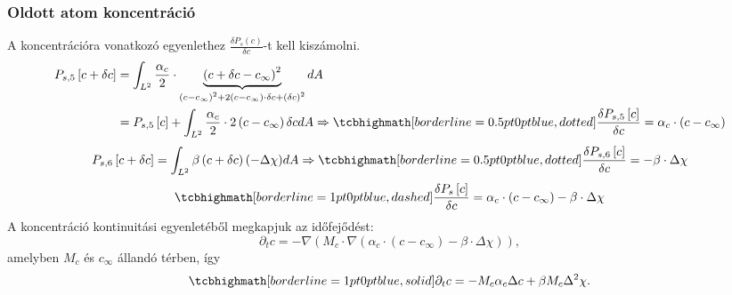 \documentclass[10pt,a4paper]{scrartcl}
\begin{document}
\subsubsection{Oldott atom koncentráció} A koncentrációra vonatkozó egyenlethez $\frac{{\delta {P_s}\left( c \right)}}{{\delta c}}$-t kell kiszámolni.
\begin{align}
  {P_{s,5}}\left[ {c + \delta c} \right] &  = \int_{{L^2}} {\frac{\alpha_c}{2}  \cdot \underbrace {{{\left( {c + \delta c - {c_\infty }} \right)}^2}}_{{{\left( {c - {c_\infty }} \right)}^2} + 2\left( {c - {c_\infty }} \right) \cdot \delta c + {{\left( {\delta c} \right)}^2}}dA} \nonumber \\ 
   &  = {P_{s,5}}\left[ c \right] + \int_{{L^2}} {\frac{\alpha_c}{2}  \cdot 2\left( {c - {c_\infty }} \right)\delta cdA}  \Rightarrow\tcbhighmath[borderline={0.5pt}{0pt}{blue,dotted}]{ \frac{{\delta {P_{s,5}}\left[ c \right]}}{{\delta c}} = \alpha_c  \cdot \left( {c - {c_\infty }} \right)}
\end{align}
\begin{equation}
{P_{s,6}}\left[ {c + \delta c} \right] = \int_{{L^2}} {\beta \left( {c + \delta c} \right)\left( { - \Delta \chi } \right)} dA \Rightarrow \tcbhighmath[borderline={0.5pt}{0pt}{blue,dotted}]{\frac{{\delta {P_{s,6}}\left[ c \right]}}{{\delta c}} =  - \beta  \cdot \Delta \chi}
\end{equation}
\begin{equation}
\tcbhighmath[borderline={1pt}{0pt}{blue,dashed}]{\frac{{\delta {P_s}\left[ c \right]}}{{\delta c}} = \alpha_c  \cdot \left( {c - {c_\infty }} \right) - \beta  \cdot \Delta \chi }
\end{equation}
A koncentráció kontinuitási egyenletéből megkapjuk az időfejődést:
\[\partial_t c =  - \nabla \left( {{M_c} \cdot \nabla \left( {{\alpha _c} \cdot \left( {c - {c_\infty }} \right) - \beta  \cdot \Delta \chi } \right)} \right),\]
amelyben $M_c$ és $c_{\infty}$ állandó térben, így
\begin{equation} \label{eq:c}
\tcbhighmath[borderline={1pt}{0pt}{blue,solid}]{
\partial_t c =  - {M_c}{\alpha _c}\Delta c + \beta {M_c}\Delta^2 \chi}.
\end{equation}
\end{document}
